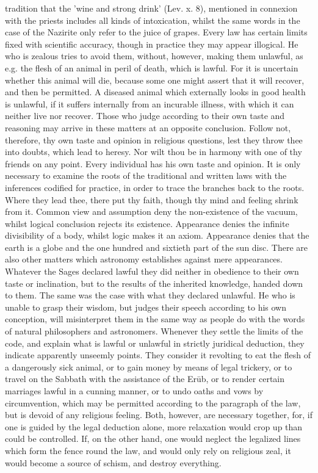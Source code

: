 \documentclass[12pt]{article}
\begin{document}
tradition that the 'wine and strong drink' (Lev. x. 8), mentioned in connexion with the priests includes all kinds of intoxication, whilst the same words in the case of the Nazirite only refer to the juice of grapes. Every law has certain limits fixed with scientific accuracy, though in practice they may appear illogical. He who is zealous tries to avoid them, without, however, making them unlawful, as e.g. the flesh of an animal in peril of death, which is lawful. For it is uncertain whether this animal will die, because some one might assert that it will recover, and then be permitted. A diseased animal which externally looks in good health is unlawful, if it suffers internally from an incurable illness, with which it can neither live nor recover. Those who judge according to their own taste and reasoning may arrive in these matters at an opposite conclusion. Follow not, therefore, thy own taste and opinion in religious questions, lest they throw thee into doubts, which lead to heresy. Nor wilt thou be in harmony with one of thy friends on any point. Every individual has his own taste and opinion. It is only necessary to examine the roots of the traditional and written laws with the inferences codified for practice, in order to trace the branches back to the roots. Where they lead thee, there put thy faith, though thy mind and feeling shrink from it. Common view and assumption deny the non-existence of the vacuum, whilst logical conclusion rejects its existence. Appearance denies the infinite divisibility of a body, whilst logic makes it an axiom. Appearance denies that the earth is a globe and the one hundred and sixtieth part of the sun disc. There are also other matters which astronomy establishes against mere appearances. Whatever the Sages declared lawful they did neither in obedience to their own taste or inclination, but to the results of the inherited knowledge, handed down to them. The same was the case with what they declared unlawful. He who is unable to grasp their wisdom, but judges their speech according to his own conception, will misinterpret them in the same way as people do with the words of natural philosophers and astronomers. Whenever they settle the limits of the code, and explain what is lawful or unlawful in strictly juridical deduction, they indicate apparently unseemly points. They consider it revolting to eat the flesh of a dangerously sick animal, or to gain money by means of legal trickery, or to travel on the Sabbath with the assistance of the Erūb, or to render certain marriages lawful in a cunning manner, or to undo oaths and vows by circumvention, which may be permitted according to the paragraph of the law, but is devoid of any religious feeling. Both, however, are necessary together, for, if one is guided by the legal deduction alone, more relaxation would crop up than could be controlled. If, on the other hand, one would neglect the legalized lines which form the fence round the law, and would only rely on religious zeal, it would become a source of schism, and destroy everything.
\end{document}
